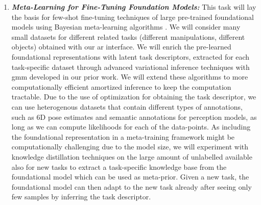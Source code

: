 \documentclass{erc-B2}
\begin{document}
\begin{enumerate}
\item \textit{\textbf{Meta-Learning for Fine-Tuning Foundation Models:}} This task will lay the basis for few-shot fine-tuning techniques of large pre-trained foundational models \cite{SAM,rtx2023arxiv,rt22023arxiv}  using  Bayesian meta-learning algorithms \cite{volpp2021bayesian,Volpp23}. 
We will consider many small datasets for different related tasks (different manipulations, different objects) obtained with our \gls*{ar} interface. 
We will enrich the pre-learned foundational representations with latent task descriptors, extracted for each task-specific dataset through advanced variational inference techniques with \gls*{gmm} \cite{arenz2020trust, arenz2022unified} developed in our prior work. We will extend these algorithms to more computationally efficient amortized inference to keep the computation tractable.
Due to the use of optimization for obtaining the task descriptor, we can use heterogenous datasets that contain different types of annotations, such as 6D pose estimates and semantic annotations for perception models, as long as we can compute likelihoods for each of the data-points. 
As including the foundational representation in a meta-training framework might be computationally challenging due to the model size, we will experiment with knowledge distillation techniques \cite{Sun_2023_ICCV,NEURIPS2021_376c6b9f} on the large amount of unlabelled available also for new tasks to extract a task-specific knowledge base from the foundational model which can be used as meta-prior.
Given a new task, the foundational model can then adapt to the new task already after seeing only few samples by inferring the task descriptor. %


\end{enumerate}
\end{document}
